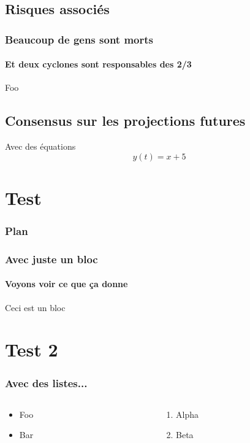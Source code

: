 \documentclass[aspectratio=169, usepdftitle=false, xcolor={dvipsnames}, 9pt]{beamer}
\begin{document}
\subsection{Risques associés}

\begin{frame}[t]
    \frametitle{Beaucoup de gens sont morts}
    \framesubtitle{Et deux cyclones sont responsables des 2/3}
    Foo
\end{frame}

\subsection{Consensus sur les projections futures}

\begin{frame}{Avec des équations}
    \begin{equation*}
        y(t) = x + 5
    \end{equation*}
\end{frame}


\section{Test}

\begin{frame}[t]
    \frametitle{Plan}
    \tableofcontents[currentsection]
\end{frame}

\begin{frame}[c]
    \frametitle{Avec juste un bloc}
    \framesubtitle{Voyons voir ce que ça donne}
    
    \begin{examples}[Test]
       Ceci est un bloc 
    \end{examples}
\end{frame}

\section{Test 2}

\begin{frame}[c]
    \frametitle{Avec des listes...}
    
    \begin{columns}
        \begin{column}{0.5\textwidth}
            \begin{itemize}
                \item Foo
                \item Bar
            \end{itemize}
        \end{column}
        \begin{column}{0.5\textwidth}
           \begin{enumerate}
               \item Alpha
               \item Beta
           \end{enumerate} 
        \end{column}
    \end{columns}
\end{frame}
\end{document}
